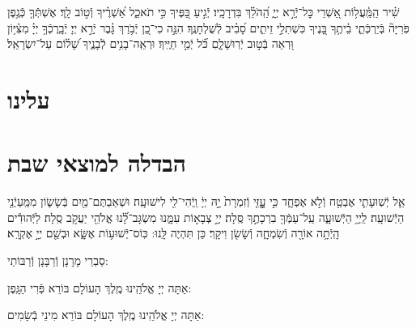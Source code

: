 \documentclass[twoside, openany, parskip=half, 11pt]{book}
\begin{document}
\sepline


שִׁ֗יר הַֽמַּֽ֫עֲל֥וֹת אַ֭שְׁרֵי כׇּל־יְֿרֵ֣א יְיָ֑ הַֽ֝הֹלֵ֗ךְ בִּדְרָכָֽיו׃
יְֿגִ֣יעַ כַּ֭פֶּיךָ כִּ֣י תֹאכֵ֑ל אַ֝שְׁרֶ֗יךָ וְֿט֣וֹב לָֽךְ׃
אֶשְׁתְּֿךָ֤ כְּֿגֶ֥פֶן פֹּֽרִיָּה֘ בְּֿיַרְכְּֿתֵ֢י בֵ֫יתֶ֥ךָ בָּ֭נֶיךָ כִּשְׁתִלֵ֣י זֵיתִ֑ים סָ֝בִ֗יב לְֿשֻׁלְחָנֶֽךָ׃
הִנֵּ֣ה כִי־כֵ֭ן יְֿבֹ֥רַךְ גָּ֗בֶר יְֿרֵ֣א יְיָ׃
יְֿבָֽרֶכְֿךָ֥ יְיָ֗ מִצִּ֫יּ֥וֹן וּ֭רְאֵה בְּֿט֣וּב יְֿרֽוּשָׁלָ֑םִ כֹּ֝֗ל יְֿמֵ֣י חַיֶּֽיךָ׃
וּרְאֵֽה־בָנִ֥ים לְֿבָנֶ֑יךָ שָׁ֝ל֗וֹם עַל־יִשְׂרָאֵֽל׃


\label{matzash_alienu}
\fullkaddish


\section*{ עלינו }


\aleinu

\vfill

\quad{}\quad{}

\clearpage

\section[הבדלה]{ הבדלה למוצאי שבת } \label{havdala}


\birkashabonim

\sepline


אֵ֧ל יְֿשֽׁוּעָתִ֛י אֶבְטַ֖ח וְֿלֹ֣א אֶפְחָ֑ד כִּ֣י עׇׇׇָזִּ֤י וְֿזִמְרָת֙ יָ֣הּ יְיָ֔ וַֽיְֿהִי־לִ֖י לִישׁוּעָֽה׃ וּשְׁאַבְתֶּם־מַ֖יִם בְּֿשָׂשׂ֑וֹן מִמַּֽעַיְֿנֵ֖י הַיְֿשׁוּעָֽה׃
לַֽיְיָ֥ הַיְֿשׁוּעָ֑ה עַֽל־עַמְּֿךָ֖ בִרְכָתֶ֣ךָ סֶּֽלָה׃
יְיָ֣ צְבָא֣וֹת עִמָּ֑נוּ מִשְׂגָּב־לָ֝֗נוּ אֱלֹהֵ֖י יַעֲקֹ֣ב סֶֽלָה׃
לַיְּֿהוּדִ֕ים הָֽיְֿתָ֥ה אוֹרָ֖ה וְֿשִׂמְחָ֑ה וְֿשָׂשׂ֖ן וִיקָֽר׃ כֵּן תִּהְיֶה לָּֽנוּ: כּֽוֹס־יְֿשׁוּע֥וֹת אֶשָּׂ֑א וּבְשֵׁ֖ם יְיָ֣ אֶקְרָֽא׃


\begin{scriptsize}
סַבְרֵי מָרָנָן וְֿרַבָּנָן וְֿרַבּוֹתַי: \\
\end{scriptsize}
אַתָּה יְיָ אֱלֹהֵֽינוּ מֶֽלֶךְ הָעוֹלָם בּוֹרֵא פְּֿרִי הַגָּֽפֶן:

אַתָּה יְיָ אֱלֹהֵֽינוּ מֶֽלֶךְ הָעוֹלָם בּוֹרֵא מִינֵי בְֿשָׂמִים:
\end{document}
